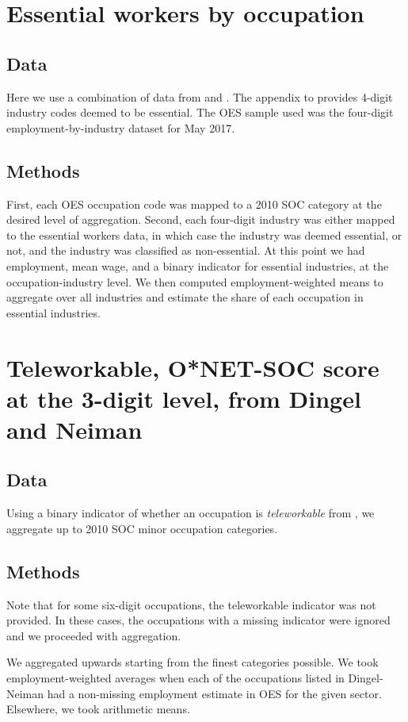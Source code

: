 \documentclass{article}
\begin{document}
\section{Essential workers by occupation}
\subsection{Data}
Here we use a combination of data from \cite{OES} and \cite{brookings}. The appendix to \cite{brookings} provides 4-digit industry codes deemed to be essential. The OES sample used was the four-digit employment-by-industry dataset for May 2017.

\subsection{Methods}
First, each OES occupation code was mapped to a 2010 SOC category at the desired level of aggregation. Second, each four-digit industry was either mapped to the essential workers data, in which case the industry was deemed essential, or not, and the industry was classified as non-essential.
At this point we had employment, mean wage, and a binary indicator for essential industries, at the occupation-industry level. We then computed employment-weighted means to aggregate over all industries and estimate the share of each occupation in essential industries.

\section{Teleworkable, O*NET-SOC score at the 3-digit level, from Dingel and Neiman}

\subsection{Data}
Using a binary indicator of whether an occupation is \emph{teleworkable} from \cite{DN}, we aggregate up to 2010 SOC minor occupation categories.

\subsection{Methods}
Note that for some six-digit occupations, the teleworkable indicator was not provided. In these cases, the occupations with a missing indicator were ignored and we proceeded with aggregation.

We aggregated upwards starting from the finest categories possible. We took employment-weighted averages when each of the occupations listed in Dingel-Neiman had a non-missing employment estimate in OES for the given sector. Elsewhere, we took arithmetic means. 
\end{document}
